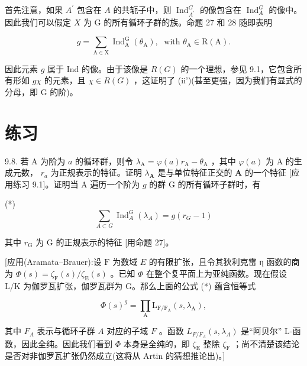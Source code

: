 \documentclass[10pt]{article}
\begin{document}
首先注意，如果 \({A}^{\prime }\) 包含在 \(A\) 的共轭子中，则 \({\operatorname{Ind}}_{{A}^{\prime }}^{G}\) 的像包含在 \({\operatorname{Ind}}_{A}^{G}\) 的像中。因此我们可以假定 \(X\) 为 G 的所有循环子群的族。命题 27 和 28 随即表明

\[
g = \mathop{\sum }\limits_{{\mathrm{A} \in  \mathrm{X}}}{\operatorname{Ind}}_{\mathrm{A}}^{\mathrm{G}}\left( {\theta }_{\mathrm{A}}\right) ,\;\text{ with }{\theta }_{\mathrm{A}} \in  \mathrm{R}\left( \mathrm{A}\right) .
\]

因此元素 \(g\) 属于 Ind 的像。由于该像是 \(R\left( G\right)\) 的一个理想，参见 9.1，它包含所有形如 \({g\chi }\) 的元素，且 \(\chi  \in  R\left( G\right)\) ，这证明了 (ii')(甚至更强，因为我们有显式的分母，即 \(\mathrm{G}\) 的阶)。

\section*{练习}

9.8. 若 \(\mathrm{A}\) 为阶为 \(a\) 的循环群，则令 \({\lambda }_{\mathrm{A}} = \varphi \left( a\right) {r}_{\mathrm{A}} - {\theta }_{\mathrm{A}}\) ，其中 \(\varphi \left( a\right)\) 为 \(\mathrm{A}\) 的生成元数， \({r}_{a}\) 为正规表示的特征。证明 \({\lambda }_{\mathbf{A}}\) 是与单位特征正交的 \(\mathbf{A}\) 的一个特征 [应用练习 9.1]。证明当 A 遍历一个阶为 \(g\) 的群 G 的所有循环子群时，有

(*)
\[
\mathop{\sum }\limits_{{A \subset  G}}{\operatorname{Ind}}_{A}^{G}\left( {\lambda }_{A}\right)  = g\left( {{r}_{G} - 1}\right)
\]

其中 \({r}_{\mathrm{G}}\) 为 \(\mathrm{G}\) 的正规表示的特征 [用命题 27]。

[应用(Aramata–Brauer):设 \(\mathrm{F}\) 为数域 \(E\) 的有限扩张，且令其狄利克雷 η 函数的商为 \(\Phi \left( s\right)  = {\zeta }_{\mathrm{F}}\left( s\right) /{\zeta }_{\mathrm{E}}\left( s\right)\) 。已知 \(\Phi\) 在整个复平面上为亚纯函数。现在假设 L/K 为伽罗瓦扩张，伽罗瓦群为 G。那么上面的公式 (*) 蕴含恒等式

\[
\Phi {\left( s\right) }^{g} = \mathop{\prod }\limits_{\mathrm{A}}{\mathrm{L}}_{\mathrm{F}/{\mathrm{F}}_{\mathrm{A}}}\left( {s,{\lambda }_{\mathrm{A}}}\right) ,
\]

其中 \({F}_{A}\) 表示与循环子群 \(A\) 对应的子域 \(F\) 。函数 \({L}_{F/{F}_{A}}\left( {s,{\lambda }_{A}}\right)\) 是“阿贝尔” L-函数，因此全纯。因此我们看到 \(\Phi\) 本身是全纯的，即 \({\zeta }_{\mathrm{E}}\) 整除 \({\zeta }_{\mathrm{F}}\) ；尚不清楚该结论是否对非伽罗瓦扩张仍然成立(这将从 Artin 的猜想推论出)。]
\end{document}
